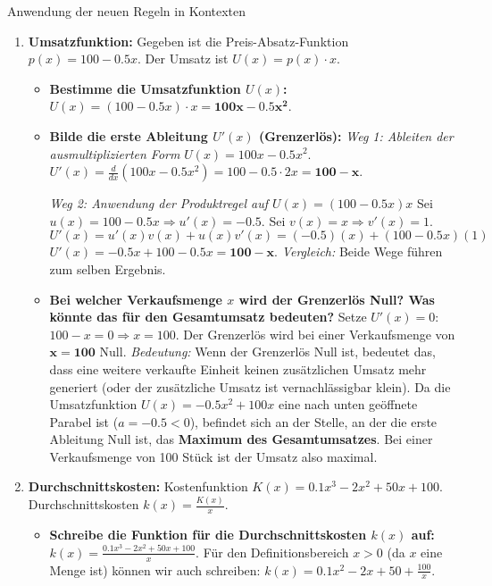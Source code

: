 \begin{loesungsumgebung}{Anwendung der neuen Regeln in Kontexten}

\begin{enumerate}[label=(\alph*)]
    \item \textbf{Umsatzfunktion:}
    Gegeben ist die Preis-Absatz-Funktion $p(x) = 100 - 0.5x$. Der Umsatz ist $U(x) = p(x) \cdot x$.
    \begin{itemize}
        \item \textbf{Bestimme die Umsatzfunktion $U(x)$:}
        $U(x) = (100 - 0.5x) \cdot x = \mathbf{100x - 0.5x^2}$.

        \item \textbf{Bilde die erste Ableitung $U'(x)$ (Grenzerlös):}
        \textit{Weg 1: Ableiten der ausmultiplizierten Form}
        $U(x) = 100x - 0.5x^2$.
        $U'(x) = \frac{d}{dx}(100x - 0.5x^2) = 100 - 0.5 \cdot 2x = \mathbf{100 - x}$.

        \textit{Weg 2: Anwendung der Produktregel auf $U(x) = (100-0.5x)x$}
        Sei $u(x) = 100-0.5x \Rightarrow u'(x) = -0.5$.
        Sei $v(x) = x \Rightarrow v'(x) = 1$.
        $U'(x) = u'(x)v(x) + u(x)v'(x) = (-0.5)(x) + (100-0.5x)(1)$
        $U'(x) = -0.5x + 100 - 0.5x = \mathbf{100 - x}$.
        \textit{Vergleich:} Beide Wege führen zum selben Ergebnis.

        \item \textbf{Bei welcher Verkaufsmenge $x$ wird der Grenzerlös Null? Was könnte das für den Gesamtumsatz bedeuten?}
        Setze $U'(x) = 0$:
        $100 - x = 0 \Rightarrow x = 100$.
        Der Grenzerlös wird bei einer Verkaufsmenge von $\mathbf{x=100}$ Null.
        \textit{Bedeutung:} Wenn der Grenzerlös Null ist, bedeutet das, dass eine weitere verkaufte Einheit keinen zusätzlichen Umsatz mehr generiert (oder der zusätzliche Umsatz ist vernachlässigbar klein). Da die Umsatzfunktion $U(x) = -0.5x^2 + 100x$ eine nach unten geöffnete Parabel ist ($a=-0.5 < 0$), befindet sich an der Stelle, an der die erste Ableitung Null ist, das \textbf{Maximum des Gesamtumsatzes}. Bei einer Verkaufsmenge von 100 Stück ist der Umsatz also maximal.
    \end{itemize}

    \item \textbf{Durchschnittskosten:}
    Kostenfunktion $K(x) = 0.1x^3 - 2x^2 + 50x + 100$. Durchschnittskosten $k(x) = \frac{K(x)}{x}$.
    \begin{itemize}
        \item \textbf{Schreibe die Funktion für die Durchschnittskosten $k(x)$ auf:}
        $k(x) = \frac{0.1x^3 - 2x^2 + 50x + 100}{x}$.
        Für den Definitionsbereich $x>0$ (da $x$ eine Menge ist) können wir auch schreiben:
        $k(x) = 0.1x^2 - 2x + 50 + \frac{100}{x}$.


\end{itemize}
\end{enumerate}
\end{loesungsumgebung}
